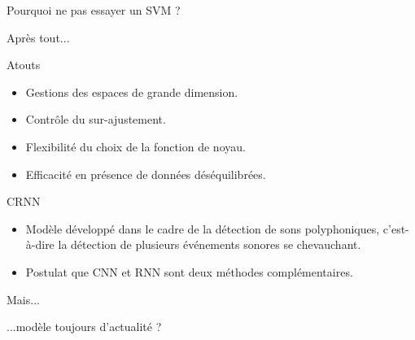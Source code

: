 \documentclass[compress,xcolor=table]{beamer}
\begin{document}
\begin{frame}{Pourquoi ne pas essayer un SVM ?}

    Après tout...

    \begin{block}{Atouts}
        \begin{itemize}
            \item Gestions des espaces de grande dimension.
            \item Contrôle du sur-ajustement.
            \item Flexibilité du choix de la fonction de noyau.
            \item Efficacité en présence de données déséquilibrées.
        \end{itemize}
    \end{block}

\end{frame}

\begin{frame}{CRNN}

    \begin{block}{\cite{cakirConvolutionalRecurrentNeural2017a}}

        \begin{itemize}
            \item Modèle développé dans le cadre de la détection de sons polyphoniques, c'est-à-dire la détection de plusieurs événements sonores se chevauchant.
            \item Postulat que CNN et RNN sont deux méthodes complémentaires.
        \end{itemize}

    \end{block}

    \begin{alertblock}{Mais...}

        ...modèle toujours d'actualité ?

    \end{alertblock}

\end{frame}
\end{document}
